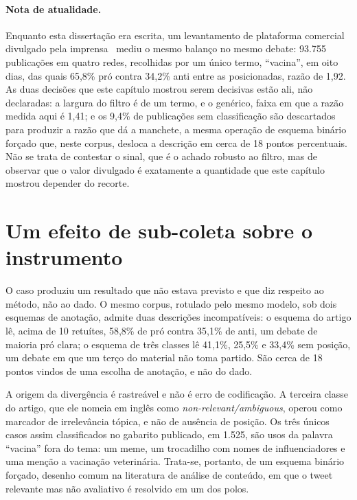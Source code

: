\paragraph{Nota de atualidade.} Enquanto esta dissertação era escrita, um
levantamento de plataforma comercial divulgado pela imprensa~\cite{bbc2026vacinas}
mediu o mesmo balanço no mesmo debate: 93.755 publicações em quatro redes,
recolhidas por um único termo, ``vacina'', em oito dias, das quais 65,8\% pró
contra 34,2\% anti entre as posicionadas, razão de 1,92. As duas decisões que este
capítulo mostrou serem decisivas estão ali, não declaradas: a largura do filtro é
de um termo, e o genérico, faixa em que a razão medida aqui é 1,41; e os 9,4\% de
publicações sem classificação são descartados para produzir a razão que dá a
manchete, a mesma operação de esquema binário forçado que, neste corpus, desloca
a descrição em cerca de 18 pontos percentuais. Não se trata de contestar o sinal,
que é o achado robusto ao filtro, mas de observar que o valor divulgado é
exatamente a quantidade que este capítulo mostrou depender do recorte.

\section{Um efeito de sub-coleta sobre o instrumento}

O caso produziu um resultado que não estava previsto e que diz respeito ao
método, não ao dado. O mesmo corpus, rotulado pelo mesmo modelo, sob dois esquemas
de anotação, admite duas descrições incompatíveis: o esquema do artigo lê, acima
de 10 retuítes, 58,8\% de pró contra 35,1\% de anti, um debate de maioria pró
clara; o esquema de três classes lê 41,1\%, 25,5\% e 33,4\% sem posição, um debate
em que um terço do material não toma partido. São cerca de 18 pontos vindos de uma
escolha de anotação, e não do dado.

A origem da divergência é rastreável e não é erro de codificação. A terceira classe
do artigo, que ele nomeia em inglês como \emph{non-relevant/ambiguous}, operou como
marcador de irrelevância tópica, e não de ausência de posição. Os três únicos casos
assim classificados no gabarito publicado, em 1.525, são usos da palavra ``vacina''
fora do tema: um meme, um trocadilho com nomes de influenciadores e uma menção a
vacinação veterinária. Trata-se,
portanto, de um esquema binário forçado, desenho comum na literatura de análise de
conteúdo, em que o tweet relevante mas não avaliativo é resolvido em um dos polos.

